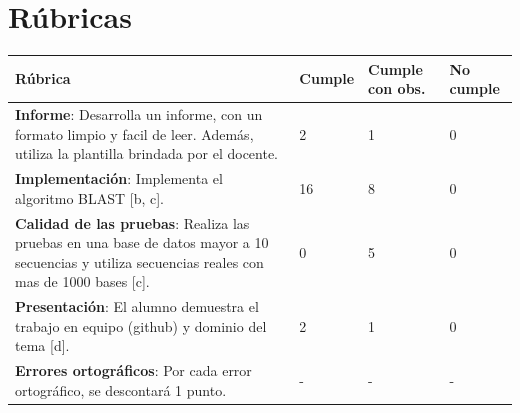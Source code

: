 \documentclass{article}
\begin{document}
\clearpage
\section{Rúbricas}

\begin{table}[hbt!]
	\setlength{\tabcolsep}{0.5em} %
	{\renewcommand{\arraystretch}{1.5}%
		\begin{tabular}{|p{5cm}|x{3cm}|x{3cm}|x{3cm}|}
			\hline 
			\textbf{Rúbrica} & \textbf{Cumple}  & \textbf{Cumple con obs.}  & \textbf{No cumple} \\
			\hline 
			\textbf{Informe}: Desarrolla un informe, con un formato limpio y facil de leer. Además, utiliza la plantilla brindada por el docente.   & 2 & 1 & 0   \\ 
			\hline 
			\textbf{Implementación}: Implementa el algoritmo BLAST [b, c].   & 16 & 8 & 0   \\ \hline			
			
			\textbf{Calidad de las pruebas}: Realiza las pruebas en una base de datos mayor a 10 secuencias y utiliza secuencias reales con mas de 1000 bases [c].  & 0 & 5 & 0   \\ \hline
			
			\textbf{Presentación}: El alumno demuestra el trabajo en equipo (github) y dominio del tema [d]. & 2 & 1 & 0   \\ 			\hline 
			
			\textbf{Errores ortográficos}: Por cada error ortográfico, se descontará 1 punto.  & - & - & -   \\ \hline
			
		\end{tabular}
	}
\end{table}

	
\end{document}
